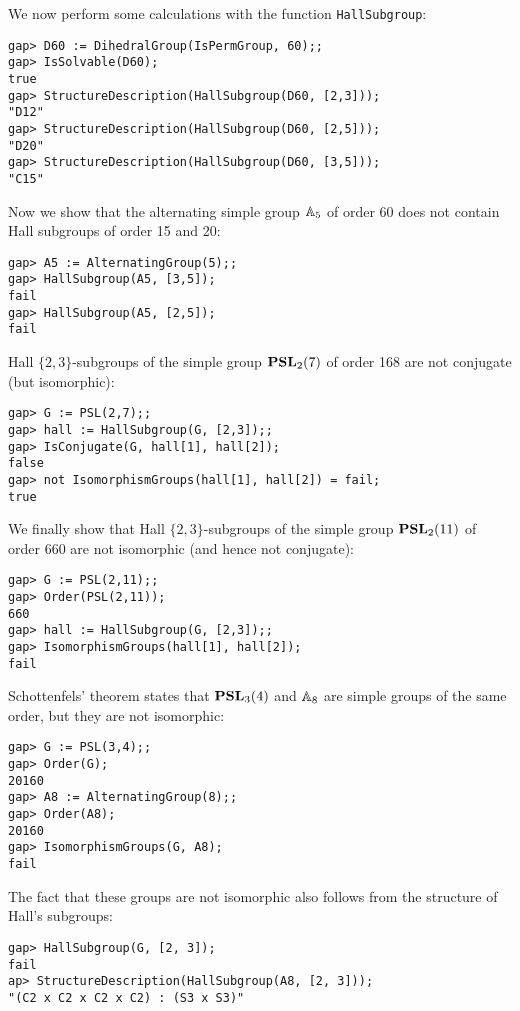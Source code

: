 \begin{example}
We now perform some calculations
with the function \lstinline{HallSubgroup}:
\begin{lstlisting}
gap> D60 := DihedralGroup(IsPermGroup, 60);;
gap> IsSolvable(D60);
true
gap> StructureDescription(HallSubgroup(D60, [2,3]));
"D12"
gap> StructureDescription(HallSubgroup(D60, [2,5]));
"D20"
gap> StructureDescription(HallSubgroup(D60, [3,5]));
"C15"
\end{lstlisting}

Now we show that the alternating simple group $\mathbb{A}_5$ 
of order 60 does not contain 
Hall subgroups of order 15 and 20: 
\begin{lstlisting}
gap> A5 := AlternatingGroup(5);;
gap> HallSubgroup(A5, [3,5]);
fail
gap> HallSubgroup(A5, [2,5]);
fail
\end{lstlisting}

Hall $\{2,3\}$-subgroups of the simple group $\mathbf{PSL}_2(7)$ of order 168 
are not conjugate (but isomorphic):  
\begin{lstlisting}
gap> G := PSL(2,7);;
gap> hall := HallSubgroup(G, [2,3]);;
gap> IsConjugate(G, hall[1], hall[2]);
false
gap> not IsomorphismGroups(hall[1], hall[2]) = fail;
true
\end{lstlisting}

We finally show that Hall $\{2,3\}$-subgroups of the 
simple group $\mathbf{PSL}_2(11)$ of order 660 
are not isomorphic (and hence not conjugate): 
\begin{lstlisting}
gap> G := PSL(2,11);;
gap> Order(PSL(2,11));
660
gap> hall := HallSubgroup(G, [2,3]);;
gap> IsomorphismGroups(hall[1], hall[2]);
fail
\end{lstlisting}    
\end{example}

\begin{example}
    Schottenfels' theorem \cite[Theorem 8.24]{MR1307623} 
    states that $\mathbf{PSL}_3(4)$ and $\mathbb{A}_8$ are simple 
    groups of the same order, but they are not isomorphic: 
\begin{lstlisting}
gap> G := PSL(3,4);;
gap> Order(G);
20160
gap> A8 := AlternatingGroup(8);;
gap> Order(A8);
20160
gap> IsomorphismGroups(G, A8);
fail
\end{lstlisting}
The fact that these groups are not isomorphic also follows
from the structure of Hall's subgroups:
\begin{lstlisting}
gap> HallSubgroup(G, [2, 3]);
fail
ap> StructureDescription(HallSubgroup(A8, [2, 3]));
"(C2 x C2 x C2 x C2) : (S3 x S3)"
\end{lstlisting}
\end{example}

